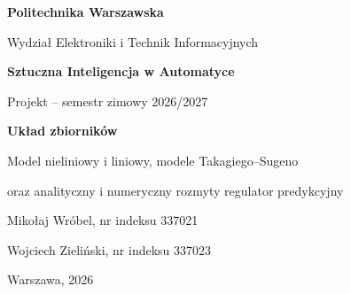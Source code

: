 \documentclass[a4paper,titlepage,11pt,floatssmall]{mwrep}
\begin{document}
\frenchspacing
\raggedbottom
\setlength{\intextsep}{8pt}
\pagestyle{uheadings}
\hypersetup{pageanchor=false}
\begin{titlepage}
\begin{center}
{\LARGE\bfseries Politechnika Warszawska\par}
\vspace{0.4cm}
{\Large Wydział Elektroniki i Technik Informacyjnych\par}
\vspace{3.3cm}
{\LARGE\bfseries Sztuczna Inteligencja w Automatyce\par}
\vspace{0.7cm}
{\Large Projekt -- semestr zimowy 2026/2027\par}
\vspace{1.2cm}
{\LARGE\bfseries Układ zbiorników\par}
\vspace{0.4cm}
{\large Model nieliniowy i liniowy, modele Takagiego--Sugeno\par
oraz analityczny i numeryczny rozmyty regulator predykcyjny\par}
\vspace{2cm}
{\large Mikołaj Wróbel, nr indeksu 337021\par}
\vspace{0.4cm}
{\large Wojciech Zieliński, nr indeksu 337023\par}
\vfill
{\large Warszawa, 2026\par}
\end{center}
\end{titlepage}
\hypersetup{pageanchor=true}








\end{document}
